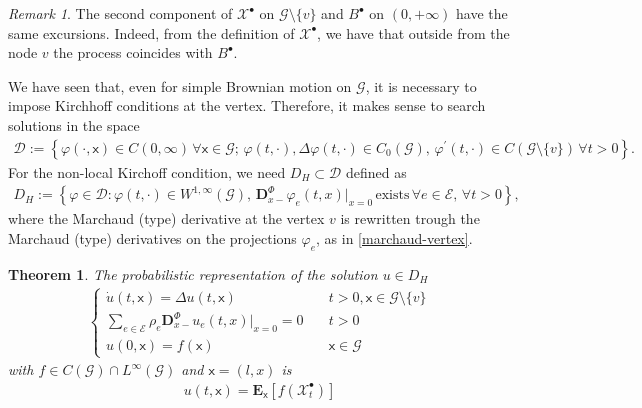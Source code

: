 \documentclass[11pt,a4paper]{article}
\theoremstyle{plain}
\newtheorem{theorem}{Theorem}[section]
\theoremstyle{definition}
\theoremstyle{remark}
\newtheorem{remark}{Remark}
\begin{document}
		\begin{remark}
			The second component of $\mathcal{X}^\bullet$ on $\mathcal{G} \setminus \{v\}$ and $B^\bullet$ on $(0,+\infty)$ have the same excursions. Indeed, from the definition of $\mathcal{X}^\bullet$, we have that outside from the node $v$ the process coincides with $B^\bullet$.
		\end{remark}
		We have seen that, even for simple Brownian motion on $\mathcal{G}$, it is necessary to impose Kirchhoff conditions at the vertex. Therefore, it makes sense to search solutions in the space
		\begin{align*}
			\mathcal{D}:=\left\{\varphi(\cdot,\mathsf{x}) \in C(0,\infty) \, \forall\mathsf{x}\in \mathcal{G}; \, \varphi(t, \cdot), \Delta\varphi(t, \cdot) \in C_0(\mathcal{G}), \, \varphi^\prime(t, \cdot) \in C(\mathcal{G}\setminus\{v\}) \, \forall t >0 \right\}.
		\end{align*}
		For the non-local Kirchoff condition, we need $D_H \subset \mathcal{D}$ defined as
		\begin{align*}
			D_H:=\left\{\varphi \in \mathcal{D}: \varphi(t,\cdot) \in W^{1,\infty}(\mathcal{G}), \, \mathbf{D}^\Phi_{x-} \varphi_e(t,x)\big\vert_{x=0} \, \text{exists} \, \forall e \in \mathcal{E}, \, \forall t>0 \right\},
		\end{align*}
		where the Marchaud (type) derivative at the vertex $v$ is rewritten trough the Marchaud (type) derivatives on the projections $\varphi_e$, as in \eqref{marchaud-vertex}.
		\begin{theorem}
			\label{thm:Xpallino}
			The probabilistic representation of the solution $u \in D_H$
			\begin{align}
				\label{problem}
				\begin{cases}
					\dot{u}(t,\mathsf{x})= \Delta u(t,\mathsf{x}) \quad &t>0, \mathsf{x} \in \mathcal{G}\setminus \{v\} \\
					\sum_{e \in \mathcal{E}} \rho_e\mathbf{D}^\Phi_{x-} u_e(t,x)\big\vert_{x=0}=0 \quad    &t>0\\
					u(0,\mathsf{x})=f(\mathsf{x}) \quad &\mathsf{x} \in \mathcal{G}
				\end{cases}
			\end{align}
			with $f \in C(\mathcal{G}) \cap L^\infty(\mathcal{G})$  and $\mathsf{x}=(l,x)$ is
			\begin{align*}
				u(t,\mathsf{x})=\mathbf{E}_\mathsf{x}[f(\mathcal{X}^\bullet_t)]
			\end{align*}
		\end{theorem}
\end{document}
